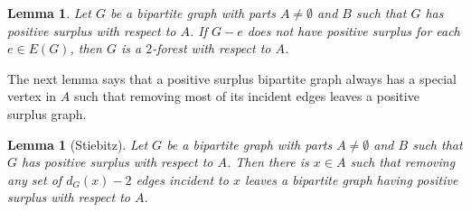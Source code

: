 \documentclass[12pt]{article}
\theoremstyle{plain}
\newtheorem{lem}[thm]{Lemma}
\theoremstyle{definition}
\theoremstyle{remark}
\begin{document}
\begin{lem}\label{PositiveSurplusIsTwoForest}
Let $G$ be a bipartite graph with parts $A \ne \emptyset$ and $B$ such that $G$ has positive surplus with respect to $A$.  If $G-e$ does not have positive surplus for each $e \in E(G)$, then $G$ is a $2$-forest with respect to $A$.
\end{lem}

The next lemma says that a positive surplus bipartite graph always has a special vertex in $A$ such that removing most of its incident edges leaves a positive surplus graph.

\begin{lem}[Stiebitz]
Let $G$ be a bipartite graph with parts $A \ne \emptyset$ and $B$ such that $G$ has positive surplus with respect to $A$.   Then there is $x \in A$ such that removing any set of $d_G(x) - 2$ edges incident to $x$ leaves a bipartite graph having positive surplus with respect to $A$.
\label{MagicVertexExists}
\end{lem}
\end{document}
